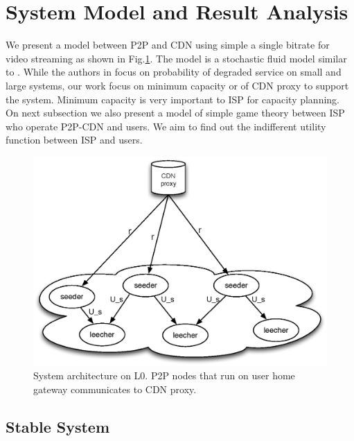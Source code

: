 \documentclass[paper]{ieice}
\begin{document}
  
 
\section{System Model and Result Analysis}\label{systemmodel}
We present a model between P2P and CDN using simple a single bitrate for video streaming as shown in Fig.\ref{fig:twotier2}. 
The model is a stochastic fluid model similar to \cite{4215694}.
While the authors in \cite{4215694} focus on probability of degraded service on small and large systems, our work focus on minimum capacity or of CDN proxy to support the system.
Minimum capacity is very important to ISP for capacity planning.
On next subsection we also present a model of simple game theory between ISP who operate P2P-CDN and users.
We aim to find out the indifferent utility function between ISP and users.

\begin{figure}[tb] 
\begin{center}
\includegraphics[scale=0.35]{graphs/two-tier-cdn-topology-2.eps}
\end{center}
\caption{System architecture on L0. P2P nodes that run on user home gateway communicates to CDN proxy.}
\label{fig:twotier2}
\vspace{-2mm}
\end{figure}

\subsection{Stable System}
\end{document}
